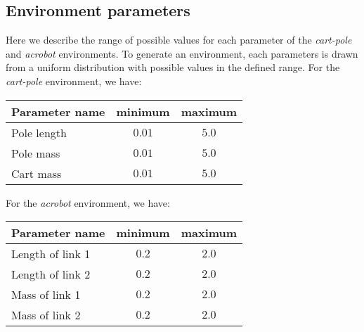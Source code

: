 \begin{appendices}
\section{Environment parameters} %
\label{sec:environment_parameters}
Here we describe the range of possible values for each parameter of the \textit{cart-pole} and \textit{acrobot} environments.
To generate an environment, each parameters is drawn from a uniform distribution with possible values in the defined range.
For the \textit{cart-pole} environment, we have:
\begin{table}[H]
    \centering
    \begin{tabular}{l|cc}
    \hline
    \textbf{Parameter name} & \textbf{minimum} & \textbf{maximum} \\
    \hline
        Pole length & $0.01$ & $5.0$ \\
        Pole mass & $0.01$ & $5.0$ \\
        Cart mass & $0.01$ & $5.0$ \\
    \hline
    \end{tabular}
\end{table}
For the \textit{acrobot} environment, we have:
\begin{table}[H]
    \centering
    \begin{tabular}{l|cc}
    \hline
    \textbf{Parameter name} & \textbf{minimum} & \textbf{maximum} \\
    \hline
        Length of link 1 & $0.2$ & $2.0$ \\
        Length of link 2 & $0.2$ & $2.0$ \\
        Mass of link 1 & $0.2$ & $2.0$ \\
        Mass of link 2 & $0.2$ & $2.0$ \\
    \hline
    \end{tabular}
\end{table}

\end{appendices}
